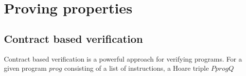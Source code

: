 \documentclass{kththesis}
\begin{document}
\chapter{Proving properties}


\section{Contract based verification}

Contract based verification is a powerful approach for verifying programs. For a given program $prog$ consisting of a list of instructions, a Hoare triple ${P}prog{Q}$



\end{document}
